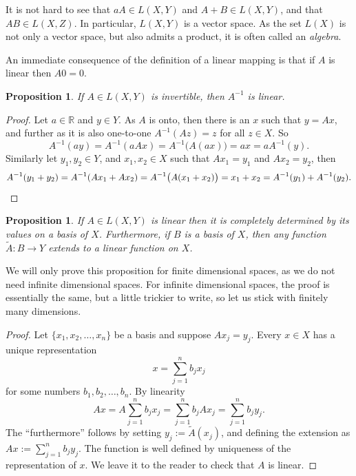 \documentclass[12pt]{book}
\newcommand{\R}{{\mathbb{R}}}
\newcommand{\myindex}[1]{#1\index{#1}}
\theoremstyle{plain}
\newtheorem{prop}[thm]{Proposition}
\theoremstyle{remark}
\theoremstyle{definition}
\theoremstyle{exercise}
\theoremstyle{example}
\begin{document}
It is not hard to see that $aA \in L(X,Y)$
and $A+B \in L(X,Y)$, and that $AB \in L(X,Z)$.
In particular, $L(X,Y)$ is a vector space.
As the set $L(X)$ is not only a vector space, but also
admits a product, it is often called an \emph{\myindex{algebra}}.

An immediate consequence of the definition of a linear mapping is that if
$A$ is linear then $A0 = 0$.

\begin{prop}
If $A \in L(X,Y)$ is invertible, then $A^{-1}$ is linear.
\end{prop}

\begin{proof}
Let $a \in \R$ and $y \in Y$.  As $A$ is onto, then there is an 
$x$ such that $y = Ax$, and further as it is also one-to-one
$A^{-1}(Az) = z$ for all $z \in X$.  So
\begin{equation*}
A^{-1}(ay)
=
A^{-1}(aAx)
=
A^{-1}\bigl(A(ax)\bigr)
= ax
= aA^{-1}(y).
\end{equation*}
Similarly let $y_1,y_2 \in Y$, and $x_1, x_2 \in X$ such that
$Ax_1 = y_1$ and 
$Ax_2 = y_2$, then
\begin{equation*}
A^{-1}(y_1+y_2)
=
A^{-1}(Ax_1+Ax_2)
=
A^{-1}\bigl(A(x_1+x_2)\bigr)
= x_1+x_2
= A^{-1}(y_1) + A^{-1}(y_2). \qedhere
\end{equation*}
\end{proof}

\begin{prop} \label{mv:lindefonbasis}
If $A \in L(X,Y)$ is linear then it is completely determined
by its values on a basis of $X$.
Furthermore, if $B$ is a basis of $X$,
then any function $\widetilde{A} \colon B \to Y$ extends to a linear
function on $X$.
\end{prop}

We will only prove this proposition for finite dimensional spaces, as we do
not need infinite dimensional spaces.
For infinite dimensional spaces, the proof is essentially the same, but a
little trickier to write, so let us stick with finitely many dimensions.

\begin{proof}
Let $\{ x_1, x_2, \ldots, x_n \}$ be a basis and suppose 
$A x_j = y_j$.  Every $x \in X$ has a unique representation
\begin{equation*}
x = \sum_{j=1}^n b_j x_j
\end{equation*}
for some numbers $b_1,b_2,\ldots,b_n$.  By linearity
\begin{equation*}
Ax = 
A\sum_{j=1}^n b_j x_j
=
\sum_{j=1}^n b_j Ax_j
=
\sum_{j=1}^n b_j y_j .
\end{equation*}
The ``furthermore'' follows by setting $y_j := \widetilde{A}(x_j)$,
and defining the extension as
$Ax := \sum_{j=1}^n b_j y_j$.  The function is well defined by
uniqueness of the representation of $x$.
We leave it to the reader to check that $A$ is linear.
\end{proof}
\end{document}
